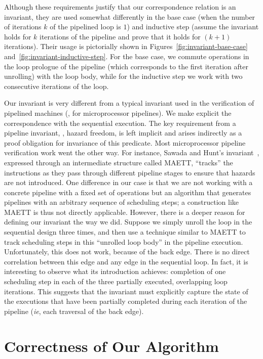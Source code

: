 Although these requirements justify that our correspondence
relation is an invariant, they are used somewhat differently
in the base case (when the number of iterations $k$ of the
pipelined loop is $1$) and inductive step (assume the
invariant holds for $k$ iterations of the pipeline and prove
that it holds for $(k+ 1)$ iterations).  Their usage is
pictorially shown in Figures~\ref{fig:invariant-base-case}
and~\ref{fig:invariant-inductive-step}.  For
the base case, we commute operations in the loop prologue of
the pipeline (which corresponds to the first iteration after
unrolling) with the loop body, while for the inductive step
we work with two consecutive iterations of the loop.

Our invariant is very different from a typical invariant
used in the verification of pipelined machines (\eg, for
microprocessor pipelines).  We make explicit the
correspondence with the sequential execution.  The key
requirement from a pipeline invariant, \viz, hazard freedom,
is left implicit and arises indirectly as a proof obligation
for invariance of this predicate.  Most microprocessor
pipeline verification work went the other way.  For
instance, Sawada and Hunt's invariant~\cite{sh:pipeline},
expressed through an intermediate structure called MAETT,
``tracks'' the instructions as they pass through different
pipeline stages to ensure that hazards are not introduced.
One difference in our case is that we are not working with a
concrete pipeline with a fixed set of operations but an
algorithm that generates pipelines with an arbitrary
sequence of scheduling steps; a construction like MAETT is
thus not directly applicable.  However, there is a deeper
reason for defining our invariant the way we did.
Suppose we simply unroll the loop in the sequential
design three times, and then use a technique similar to
MAETT to track scheduling steps in this ``unrolled loop
body'' in the pipeline execution.  Unfortunately, this does
not work, because of the back edge.  There is no direct
correlation between this edge and any edge in the sequential
loop.  In fact, it is interesting to observe what its
introduction achieves: completion of one scheduling step in
each of the three partially executed, overlapping loop
iterations.  This suggests that the invariant must
explicitly capture the state of the executions that have
been partially completed during each iteration of the
pipeline ({\em ie}, each traversal of the back edge).


\section{Correctness of Our Algorithm}

